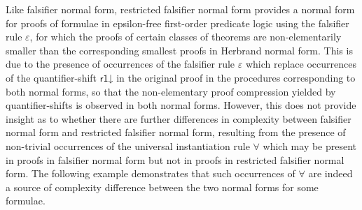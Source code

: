 \documentclass[10pt]{article}
\theoremstyle{definition}\newtheorem{remark}[theorem]{Remark}
\theoremstyle{definition}\newtheorem{example}[theorem]{Example}
\theoremstyle{definition}\newtheorem{definition}[theorem]{Definition}
\newcommand{\rOneDown}{{\mathsf{r1\mathord\downarrow}}}
\newcommand{\falsifierRule}{{\mathsf{\varepsilon}}}
\begin{document}
	Like falsifier normal form, restricted falsifier normal form provides a normal form for proofs of formulae in epsilon-free first-order predicate logic using the falsifier rule $\falsifierRule$, for which the proofs of certain classes of theorems are non-elementarily smaller than the corresponding smallest proofs in Herbrand normal form. This is due to the presence of occurrences of the falsifier rule $\falsifierRule$ which replace occurrences of the quantifier-shift $\rOneDown$ in the original proof in the procedures corresponding to both normal forms, so that the non-elementary proof compression yielded by quantifier-shifts is observed in both normal forms. However, this does not provide insight as to whether there are further differences in complexity between falsifier normal form and restricted falsifier normal form, resulting from the presence of non-trivial occurrences of the universal instantiation rule $\forall$ which may be present in proofs in falsifier normal form but not in proofs in restricted falsifier normal form. The following example demonstrates that such occurrences of $\forall$ are indeed a source of complexity difference between the two normal forms for some formulae.
	
\end{document}
